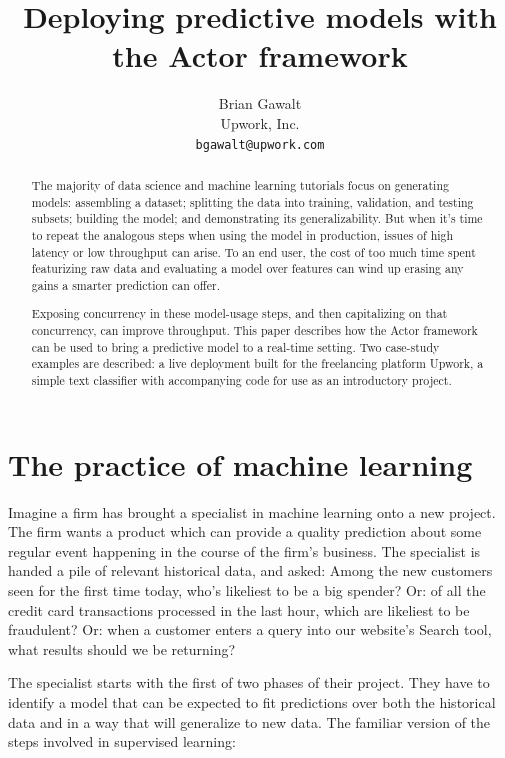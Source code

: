 \documentclass{article}
\begin{document}
\title{Deploying predictive models with the Actor framework}
\author{Brian Gawalt \\
Upwork, Inc. \\
\texttt{bgawalt@upwork.com}
}

\maketitle

\begin{abstract}
 The majority of data science and machine learning tutorials focus on generating
models: assembling a dataset; splitting the data into training, validation, and
testing subsets; building the model; and demonstrating its generalizability. But
when it's time to repeat the analogous steps when using the model in production,
issues of high latency or low throughput can arise. To an end user, the cost of
too much time spent featurizing raw data and evaluating a model over features
can wind up erasing any gains a smarter prediction can offer.

 Exposing concurrency in these model-usage steps, and then capitalizing on that
concurrency, can improve throughput. This paper describes how the Actor
framework can be used to bring a predictive model to a real-time setting. Two
case-study examples are described: a live deployment built for the freelancing 
platform Upwork, a simple text classifier with accompanying code for use as an
introductory project.
\end{abstract}

\section{The practice of machine learning}

 Imagine a firm has brought a specialist in machine learning onto a new project.
The firm wants a product which can provide a quality prediction about some
regular event happening in the course of the firm's business. The specialist is
handed a pile of relevant historical data, and asked: Among the new customers
seen for the first time today, who's likeliest to be a big spender? Or: of all
the credit card transactions processed in the last hour, which are likeliest to
be fraudulent? Or: when a customer enters a query into our website's Search
tool, what results should we be returning?

 The specialist starts with the first of two phases of their project. They have
to identify a model that can be expected to fit predictions over both the
historical data and in a way that will generalize to new data. The familiar
version of the steps involved in supervised learning:
\end{document}
